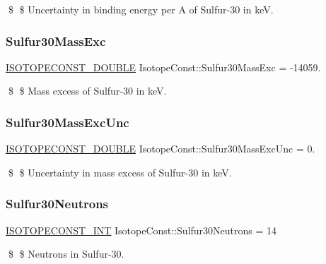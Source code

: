 \$ \$ Uncertainty in binding energy per A of Sulfur-\/30 in keV. \mbox{\label{group___isotope_const-_sulfur-_s30_ga4aa7736b6712a14095f1ea23b2f5d1d7}} 
\subsubsection{\texorpdfstring{Sulfur30\+Mass\+Exc}{Sulfur30MassExc}}
{\footnotesize\ttfamily \mbox{\hyperlink{group___isotope_const-_macros_ga8f45a7272ce02c0b4c65c44636ed719a}{I\+S\+O\+T\+O\+P\+E\+C\+O\+N\+S\+T\+\_\+\+D\+O\+U\+B\+LE}} Isotope\+Const\+::\+Sulfur30\+Mass\+Exc = -\/14059.}

\$ \$ Mass excess of Sulfur-\/30 in keV. \mbox{\label{group___isotope_const-_sulfur-_s30_ga39b096eb7991304017a7e51cc1234b4f}} 
\subsubsection{\texorpdfstring{Sulfur30\+Mass\+Exc\+Unc}{Sulfur30MassExcUnc}}
{\footnotesize\ttfamily \mbox{\hyperlink{group___isotope_const-_macros_ga8f45a7272ce02c0b4c65c44636ed719a}{I\+S\+O\+T\+O\+P\+E\+C\+O\+N\+S\+T\+\_\+\+D\+O\+U\+B\+LE}} Isotope\+Const\+::\+Sulfur30\+Mass\+Exc\+Unc = 0.}

\$ \$ Uncertainty in mass excess of Sulfur-\/30 in keV. \mbox{\label{group___isotope_const-_sulfur-_s30_gad9064471f5ec5a5c05693a62108da4d9}} 
\subsubsection{\texorpdfstring{Sulfur30\+Neutrons}{Sulfur30Neutrons}}
{\footnotesize\ttfamily \mbox{\hyperlink{group___isotope_const-_macros_ga5f18360b3e99483a35c32d789e62621c}{I\+S\+O\+T\+O\+P\+E\+C\+O\+N\+S\+T\+\_\+\+I\+NT}} Isotope\+Const\+::\+Sulfur30\+Neutrons = 14}

\$ \$ Neutrons in Sulfur-\/30. \mbox{\label{group___isotope_const-_sulfur-_s30_gad4510004721bf18eac8aa67b05dce254}} 
